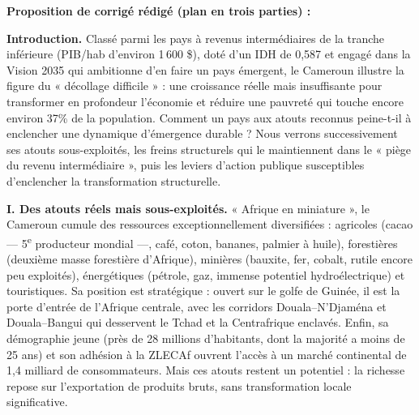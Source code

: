\documentclass[11pt]{article}
\begin{document}
\begin{corrige}
\textbf{Proposition de corrigé rédigé (plan en trois parties) :}

\textbf{Introduction.} Classé parmi les pays à revenus intermédiaires de la tranche inférieure (PIB/hab d'environ 1\,600 \$), doté d'un IDH de 0,587 et engagé dans la Vision 2035 qui ambitionne d'en faire un pays émergent, le Cameroun illustre la figure du « décollage difficile » : une croissance réelle mais insuffisante pour transformer en profondeur l'économie et réduire une pauvreté qui touche encore environ 37\% de la population. Comment un pays aux atouts reconnus peine-t-il à enclencher une dynamique d'émergence durable ? Nous verrons successivement ses atouts sous-exploités, les freins structurels qui le maintiennent dans le « piège du revenu intermédiaire », puis les leviers d'action publique susceptibles d'enclencher la transformation structurelle.

\textbf{I. Des atouts réels mais sous-exploités.} « Afrique en miniature », le Cameroun cumule des ressources exceptionnellement diversifiées : agricoles (cacao — 5\textsuperscript{e} producteur mondial —, café, coton, bananes, palmier à huile), forestières (deuxième masse forestière d'Afrique), minières (bauxite, fer, cobalt, rutile encore peu exploités), énergétiques (pétrole, gaz, immense potentiel hydroélectrique) et touristiques. Sa position est stratégique : ouvert sur le golfe de Guinée, il est la porte d'entrée de l'Afrique centrale, avec les corridors Douala--N'Djaména et Douala--Bangui qui desservent le Tchad et la Centrafrique enclavés. Enfin, sa démographie jeune (près de 28 millions d'habitants, dont la majorité a moins de 25 ans) et son adhésion à la ZLECAf ouvrent l'accès à un marché continental de 1,4 milliard de consommateurs. Mais ces atouts restent un potentiel : la richesse repose sur l'exportation de produits bruts, sans transformation locale significative.


\end{corrige}
\end{document}
